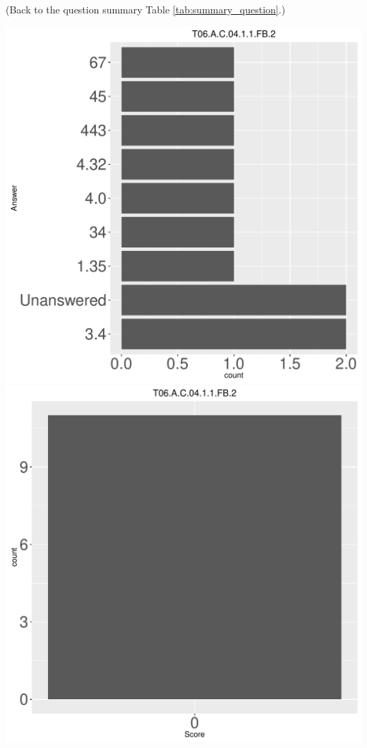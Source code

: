 \documentclass[12pt,english,nohyper]{tufte-handout}\usepackage[]{graphicx}\usepackage[]{color}
\begin{document}
 (Back to the question summary Table \ref{tab:summary_question}.)

\begin{center} \includegraphics[width=.45\linewidth]{Topic06_AB_10_answer} \includegraphics[width=.45\linewidth]{Topic06_AB_10_score} \end{center} 
\end{document}
